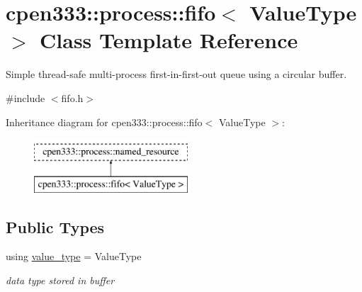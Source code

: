 \hypertarget{classcpen333_1_1process_1_1fifo}{}\section{cpen333\+:\+:process\+:\+:fifo$<$ Value\+Type $>$ Class Template Reference}
\label{classcpen333_1_1process_1_1fifo}


Simple thread-\/safe multi-\/process first-\/in-\/first-\/out queue using a circular buffer.  




{\ttfamily \#include $<$fifo.\+h$>$}

Inheritance diagram for cpen333\+:\+:process\+:\+:fifo$<$ Value\+Type $>$\+:\begin{figure}[H]
\begin{center}
\leavevmode
\includegraphics[height=2.000000cm]{classcpen333_1_1process_1_1fifo}
\end{center}
\end{figure}
\subsection*{Public Types}
\begin{DoxyCompactItemize}
\item 
\mbox{\label{classcpen333_1_1process_1_1fifo_ab49908b45dd14510ffa91c8a7f19ce89}} 
using \hyperlink{classcpen333_1_1process_1_1fifo_ab49908b45dd14510ffa91c8a7f19ce89}{value\+\_\+type} = Value\+Type
\begin{DoxyCompactList}\small\item\em data type stored in buffer \end{DoxyCompactList}\end{DoxyCompactItemize}
